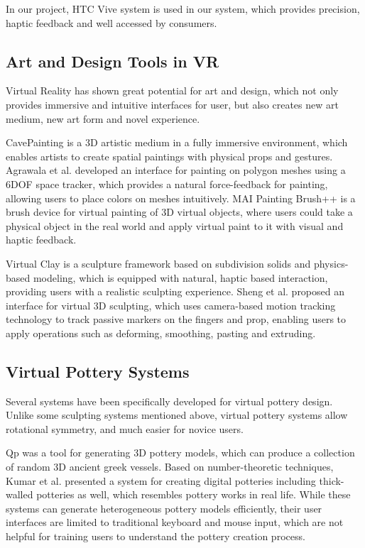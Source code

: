 In our project, HTC Vive system is used in our system, which provides precision, haptic feedback and well accessed by consumers.

\subsection{Art and Design Tools in VR}
\label{sec:2.2}
Virtual Reality has shown great potential for art and design, which not only provides immersive and intuitive interfaces for user, but also creates new art medium, new art form and novel experience\cite{laviola20113d}.

CavePainting \cite{keefe2001cavepainting} is a 3D artistic medium in a fully immersive environment, which enables artists to create spatial paintings with physical props and gestures. Agrawala et al.\cite{agrawala19953d} developed an interface for painting on polygon meshes using a 6DOF space tracker, which provides a natural force-feedback for painting, allowing users to place colors on meshes intuitively. MAI Painting Brush++ \cite{otsuki2017brush} is a brush device for virtual painting of 3D virtual objects, where users could take a physical object in the real world and apply virtual paint to it with visual and haptic feedback.

Virtual Clay \cite{mcdonnell2001virtual} is a sculpture framework based on subdivision solids and physics-based modeling, which is equipped with natural, haptic based interaction, providing users with a realistic sculpting experience. Sheng et al. \cite{sheng2006interface} proposed an interface for virtual 3D sculpting, which uses camera-based motion tracking technology to track passive markers on the fingers and prop, enabling users to apply operations such as deforming, smoothing, pasting and extruding.

\subsection{Virtual Pottery Systems}
\label{sec:2.3}


Several systems have been specifically developed for virtual pottery design. Unlike some sculpting systems mentioned above, virtual pottery systems allow rotational symmetry, and much easier for novice users.

Qp \cite{koutsoudis2009qp} was a tool for generating 3D pottery models, which can produce a collection of random 3D ancient greek vessels.
Based on number-theoretic techniques, Kumar et al. \cite{kumar2011wheel} presented a system for creating digital potteries including thick-walled potteries as well, which resembles pottery works in real life.
While these systems can generate heterogeneous pottery models efficiently, their user interfaces are limited to traditional keyboard and mouse input, which are not helpful for training users to understand the pottery creation process.

